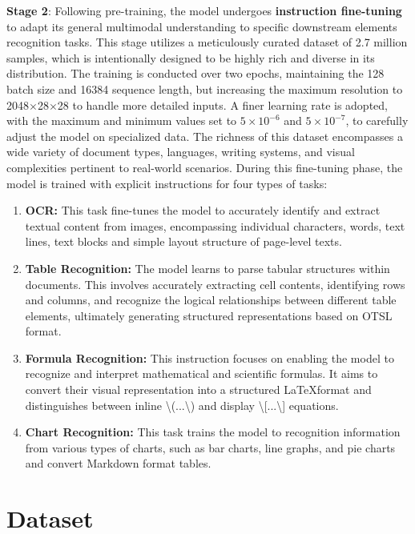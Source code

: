 \documentclass[11pt, a4paper,logo,  copyright, nonumbering]{paddleocr}
\begin{document}
\textbf{Stage 2}: Following pre-training, the model undergoes \textbf{instruction fine-tuning} to adapt its general multimodal understanding to specific downstream elements recognition tasks. This stage utilizes a meticulously curated dataset of 2.7 million samples, which is intentionally designed to be highly rich and diverse in its distribution. The training is conducted over two epochs, maintaining the 128 batch size and 16384 sequence length, but increasing the maximum resolution to 2048$\times$28$\times$28 to handle more detailed inputs. A finer learning rate is adopted, with the maximum and minimum values set to $5 \times 10^{-6}$ and $5 \times 10^{-7}$, to carefully adjust the model on specialized data. The richness of this dataset encompasses a wide variety of document types, languages, writing systems, and visual complexities pertinent to real-world scenarios. During this fine-tuning phase, the model is trained with explicit instructions for four types of tasks:
\begin{enumerate}[label=\arabic*.]
    \item \textbf{OCR:} This task fine-tunes the model to accurately identify and extract textual content from images, encompassing individual characters, words, text lines, text blocks and simple layout structure of page-level texts.
    \item \textbf{Table Recognition:} The model learns to parse tabular structures within documents. This involves accurately extracting cell contents, identifying rows and columns, and recognize the logical relationships between different table elements, ultimately generating structured representations based on OTSL~\cite{lysak2023optimized} format.
    \item \textbf{Formula Recognition:} This instruction focuses on enabling the model to recognize and interpret mathematical and scientific formulas. It aims to convert their visual representation into a structured \LaTeX format and distinguishes between inline \textbackslash(...\textbackslash) and display \textbackslash[...\textbackslash]  equations.
    \item \textbf{Chart Recognition:} This task trains the model to recognition information from various types of charts, such as bar charts, line graphs, and pie charts and convert Markdown format tables.
\end{enumerate}

\section{Dataset}
\end{document}
